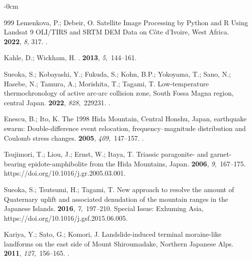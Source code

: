 \documentclass[land,article,accept,pdftex,moreauthors]{Definitions/mdpi}
\begin{document}
\begin{adjustwidth}{-\extralength}{0cm}
\begin{thebibliography}{999}
Lemenkova, P.; Debeir, O.
\newblock Satellite Image Processing by Python and R Using Landsat 9 OLI/TIRS
  and SRTM DEM Data on Côte d'Ivoire, West Africa.
 {\bf 2022}, {\em 8}, 317.
.

Kahle, D.; Wickham, H.
.
 {\bf 2013}, {\em 5},~144--161.

Sueoka, S.; Kobayashi, Y.; Fukuda, S.; Kohn, B.P.; Yokoyama, T.; Sano, N.;
  Hasebe, N.; Tamura, A.; Morishita, T.; Tagami, T.
\newblock Low-temperature thermochronology of active arc-arc collision zone,
  South Fossa Magna region, central Japan.
 {\bf 2022}, {\em 828},~229231.
.

Enescu, B.; Ito, K.
\newblock The 1998 Hida Mountain, Central Honshu, Japan, earthquake swarm:
  Double-difference event relocation, frequency–magnitude distribution and
  Coulomb stress changes.
 {\bf 2005}, {\em 409},~147--157.\linebreak
{}.

Tsujimori, T.; Liou, J.; Ernst, W.; Itaya, T.
\newblock Triassic paragonite- and garnet-bearing epidote-amphibolite from the
  Hida Mountains, Japan.
 {\bf 2006}, {\em 9},~167--175.
  {{https://doi.org/10.1016/j.gr.2005.03.001}}.

Sueoka, S.; Tsutsumi, H.; Tagami, T.
\newblock New approach to resolve the amount of Quaternary uplift and
  associated denudation of the mountain ranges in the Japanese Islands.
 {\bf 2016}, {\em 7},~197--210.
\newblock Special Issue: Exhuming Asia,
  {{https://doi.org/10.1016/j.gsf.2015.06.005}}.

Kariya, Y.; Sato, G.; Komori, J.
\newblock Landslide-induced terminal moraine-like landforms on the east side of
  Mount Shiroumadake, Northern Japanese Alps.
 {\bf 2011}, {\em 127},~156--165.
.


\end{thebibliography}
\end{adjustwidth}
\end{document}
